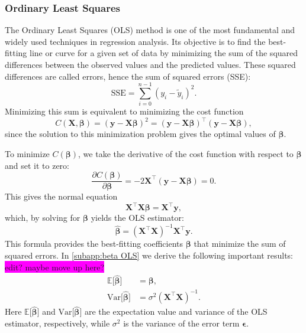 \documentclass[aps,pra,english,notitlepage,reprint,nofootinbib]{revtex4-1}  %
\begin{document}
\subsubsection{Ordinary Least Squares}\label{subsubsec:ols}
The Ordinary Least Squares (OLS) method is one of the most fundamental and widely used techniques in regression analysis. Its objective is to find the best-fitting line or curve for a given set of data by minimizing the sum of the squared differences between the observed values and the predicted values. These squared differences are called errors, hence the sum of squared errors (SSE):
\begin{equation}
\text{SSE} = \sum_{i=0}^{n-1} \left( y_i - \tilde{y}_i \right)^2.
\end{equation}
Minimizing this sum is equivalent to minimizing the cost function
\begin{equation}
C(\mathbf{X},\boldsymbol{\beta}) = \left(\mathbf{y}-\mathbf{X}\boldsymbol{\beta} \right)^2 = (\mathbf{y} - \mathbf{X} \boldsymbol{\beta})^\top (\mathbf{y} - \mathbf{X} \boldsymbol{\beta}), \label{eq:OLS cost}
\end{equation}
since the solution to this minimization problem gives the optimal values of $\boldsymbol{\beta}$.

To minimize $C(\boldsymbol{\beta})$, we take the derivative of the cost function with respect to $\boldsymbol{\beta}$ and set it to zero:
\begin{equation}
\frac{\partial C(\boldsymbol{\beta})}{\partial \boldsymbol{\beta}} = -2 \mathbf{X}^\top (\mathbf{y} - \mathbf{X} \boldsymbol{\beta}) = 0.
\end{equation}
This gives the normal equation
\begin{equation}
\mathbf{X}^\top \mathbf{X} \boldsymbol{\beta} = \mathbf{X}^\top \mathbf{y},
\end{equation}
which, by solving for $\boldsymbol{\beta}$ yields the OLS estimator:
\begin{equation}
\boldsymbol{\hat{\beta}} = (\mathbf{X}^\top \mathbf{X})^{-1} \mathbf{X}^\top \mathbf{y}.
\end{equation}
This formula provides the best-fitting coefficients $\boldsymbol{\beta}$ that minimize the sum of squared errors. In \cref{subapp:beta OLS} we derive the following important results: \colorbox{magenta}{edit? maybe move up here?}
\begin{align}
  \mathbb{E}\big[\hat{\boldsymbol{\beta}}\big] &= \boldsymbol{\beta},
  \\
  \text{Var}\big[\hat{\boldsymbol{\beta}}\big] &= \sigma^2\left(\mathbf{X}^\top\mathbf{X}\right)^{-1}.
\end{align}
Here $\mathbb{E}\big[\hat{\boldsymbol{\beta}}\big]$ and $\text{Var}\big[\hat{\boldsymbol{\beta}}\big]$ are the expectation value and variance of the OLS estimator, respectively, while $\sigma^2$ is the variance of the error term $\boldsymbol{\epsilon}$. 
\end{document}

